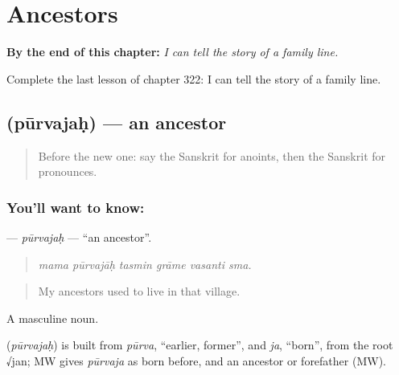 
\chapter{Ancestors}
\label{ch:sa-ancestors}

\begin{chapteropening}
\textbf{By the end of this chapter:} \emph{I can tell the story of a family line.}

Complete the last lesson of chapter 322: I can tell the story of a family line.
\end{chapteropening}

\section[\texorpdfstring{\sk{पूर्वजः} (pūrvajaḥ)}{पूर्वजः (pūrvajaḥ)}]{ (pūrvajaḥ) — an ancestor}

\label{lesson:SA-C322-purvajah}



\begin{quote}
Before the new one: say the Sanskrit for anoints, then the Sanskrit for pronounces.
\end{quote}

\subsection*{You'll want to know: }
\textbf{} — \emph{pūrvajaḥ} — \textquotedblleft{}an ancestor\textquotedblright{}.

\begin{quote}
     
\end{quote}

\begin{quote}
\emph{mama pūrvajāḥ tasmin grāme vasanti sma.}
\end{quote}

\begin{quote}
My ancestors used to live in that village.
\end{quote}

A masculine noun.

\begin{cousinweb}
\textbf{} (\emph{pūrvajaḥ}) is built from \emph{pūrva}, \textquotedblleft{}earlier, former\textquotedblright{}, and \emph{ja}, \textquotedblleft{}born\textquotedblright{}, from the root √jan; MW gives \emph{pūrvaja} as born before, and an ancestor or forefather (MW).
\end{cousinweb}

